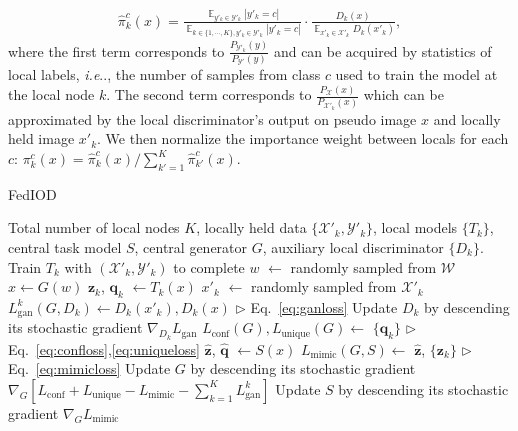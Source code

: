 \documentclass[letterpaper]{article} %
\makeatletter
\DeclareRobustCommand\onedot{\futurelet\@let@token\@onedot}
\def\@onedot{\ifx\@let@token.\else.\null\fi\xspace}
\DeclareMathOperator*{\fe}{\mathbb{E}}
\def\ie{\emph{i.e}\onedot} \def\Ie{\emph{I.e}\onedot}
\newcommand{\domw}{\mathcal{W}}
\newcommand{\domx}{\mathcal{X}}
\newcommand{\domy}{\mathcal{Y}}
\makeatother
\begin{document}
\begin{equation}
\label{eq:aggweight}
\begin{aligned}
\hat{\pi}_k^c(x) = \frac{\fe_{y'_k \in \domy'_k}|y'_k = c|}{{\fe_{ k \in \{1,\cdots,K\}, y'_k \in \domy'_k} |y'_k = c|}} \cdot \frac{D_k(x)}{\fe_{x'_k \in \domx'_k} D_k(x'_k)},
\end{aligned}
\end{equation}
where the first term corresponds to $\frac{P_{\domy'_k}(y)}{P_{\domy'}(y)}$ and can be acquired by statistics of local labels, \ie, the number of samples from class $c$ used to train the model at the local node $k$. The second term corresponds to $\frac{P_{\domx}(x)}{P_{\domx'_k}(x)}$ which can be approximated by the local discriminator's output on pseudo image $x$ and locally held image $x'_k$. We then normalize the importance weight between locals for each $c$: $\pi_k^c(x) = \hat{\pi}_k^c(x) / \sum_{k'=1}^{K} {\hat{\pi}_{k'}^c (x)}$.

\begin{algorithm}[t]
    \caption{FedIOD}
    \label{alg}
 \begin{algorithmic}
     Total number of local nodes $K$, locally held data $\{\domx'_k, \domy'_k\}$, local models $\{T_k\}$, central task model $S$, central generator $G$, auxiliary local discriminator $\{D_k\}$.
    \STATE Train $T_k$  with $(\domx'_k, \domy'_k)$ to complete
    \ENDFOR
    \STATE {\color{gray} {$\Box$ Input distillation }}
    \STATE $w$ $\leftarrow$ randomly sampled from $\domw$
    \STATE $x \leftarrow G(w)$
    \STATE $\bm{z}_k$, $\bm{q}_k$ $\leftarrow T_k(x)$
    \STATE $x'_k$ $\leftarrow$ randomly sampled from $\domx'_k$
    \STATE $L_\text{gan}^k(G,D_k) \leftarrow D_k(x'_k), D_k(x)$ \hspace*{3em} $\triangleright$  Eq.~\ref{eq:ganloss}
    \STATE Update $D_k$ by descending its stochastic gradient
    $\nabla_{D_k} L_\text{gan}$
    \ENDFOR
    \STATE $L_\text{conf}(G), L_\text{unique}(G) \leftarrow$ $\{\bm{q}_k\}$  \hspace*{5em}   $\triangleright$  Eq.~\ref{eq:confloss},\ref{eq:uniqueloss}
    \STATE {\color{gray} {$\Box$ Output distillation }}
    \STATE  $\hat{\bm{z}}$, $\hat{\bm{q}}$ $\leftarrow S(x)$
    \STATE $L_\text{mimic}(G, S) \leftarrow$  $\hat{\bm{z}}$, $\{\bm{z}_k\}$   \hspace*{6.7em}   $\triangleright$  Eq.~\ref{eq:mimicloss}
    \STATE {\color{gray} {$\Box$ Update }}
    \STATE Update $G$ by descending its stochastic gradient
    $\nabla_{G} [ L_\text{conf} +  L_\text{unique} - L_\text{mimic} - \sum_{k=1}^K L_\text{gan}^k ]$
    \STATE Update $S$ by descending its stochastic gradient
    $\nabla_{G} L_\text{mimic}$
    \ENDFOR
\end{algorithmic}
\end{algorithm}
\end{document}

